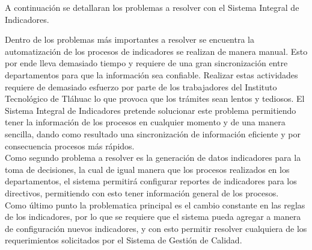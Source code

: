 A continuaci\'on se detallaran los problemas a resolver con el Sistema Integral de Indicadores.

Dentro de los problemas m\'as importantes a resolver se encuentra la automatizaci\'on de los procesos de indicadores se realizan de manera manual. Esto por ende lleva demasiado tiempo y requiere de una gran sincronizaci\'on entre departamentos para que la informaci\'on sea confiable. Realizar estas actividades requiere de demasiado esfuerzo por parte de los trabajadores del Instituto Tecnol\'ogico de Tl\'ahuac lo que provoca que los tr\'amites sean lentos y tediosos. El Sistema Integral de Indicadores pretende solucionar este problema permitiendo tener la informaci\'on de los procesos en cualquier momento y de una manera sencilla, dando como resultado una sincronizaci\'on de informaci\'on eficiente y por consecuencia procesos m\'as r\'apidos.\\

Como segundo problema a resolver es la generaci\'on de datos indicadores para la toma de decisiones, la cual de igual manera que los procesos realizados en los departamentos, el sistema permitir\'a configurar reportes de indicadores para los directivos, permitiendo con esto tener informaci\'on general de los procesos.\\

Como \'ultimo punto la problematica principal es el cambio constante en las reglas de los indicadores, por lo que se requiere que el sistema pueda agregar a manera de configuraci\'on nuevos indicadores, y con esto permitir resolver cualquiera de los requerimientos solicitados por el Sistema de Gesti\'on de Calidad.
